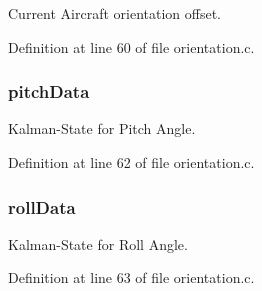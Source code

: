 Current Aircraft orientation offset. 



Definition at line 60 of file orientation.\-c.

\hypertarget{group__orientation_gaee2ebdd37342c4cfa69ce7ee1440fd1d}{
\subsubsection[{pitch\-Data}]{ pitch\-Data}}\label{group__orientation_gaee2ebdd37342c4cfa69ce7ee1440fd1d}


Kalman-\/\-State for Pitch Angle. 



Definition at line 62 of file orientation.\-c.

\hypertarget{group__orientation_ga327c51463b7ca66c1ed8d0f400ffbfec}{
\subsubsection[{roll\-Data}]{ roll\-Data}}\label{group__orientation_ga327c51463b7ca66c1ed8d0f400ffbfec}


Kalman-\/\-State for Roll Angle. 



Definition at line 63 of file orientation.\-c.

